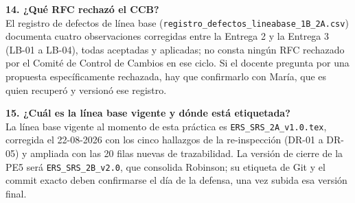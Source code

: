 \medskip
\noindent\textbf{14. ¿Qué RFC rechazó el CCB?}\\
El registro de defectos de línea base (\texttt{registro\_defectos\_lineabase\_1B\_2A.csv}) documenta cuatro observaciones corregidas entre la Entrega 2 y la Entrega 3 (LB-01 a LB-04), todas aceptadas y aplicadas; no consta ningún RFC rechazado por el Comité de Control de Cambios en ese ciclo. Si el docente pregunta por una propuesta específicamente rechazada, hay que confirmarlo con María, que es quien recuperó y versionó ese registro.

\medskip
\noindent\textbf{15. ¿Cuál es la línea base vigente y dónde está etiquetada?}\\
La línea base vigente al momento de esta práctica es \texttt{ERS\_SRS\_2A\_v1.0.tex}, corregida el 22-08-2026 con los cinco hallazgos de la re-inspección (DR-01 a DR-05) y ampliada con las 20 filas nuevas de trazabilidad. La versión de cierre de la PE5 será \texttt{ERS\_SRS\_2B\_v2.0}, que consolida Robinson; su etiqueta de Git y el commit exacto deben confirmarse el día de la defensa, una vez subida esa versión final.
